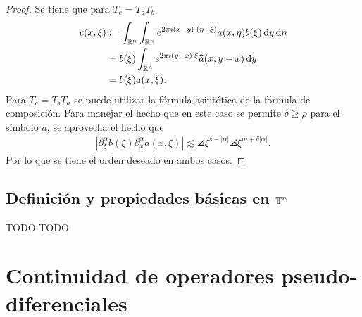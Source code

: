 \begin{proof}
	Se tiene que para $T_c = T_aT_b$
	\begin{align*}
		c(x, \xi) & :=  \int_{\mathbb{R}^n}\int_{\mathbb{R}^n} 
		e^{2\pi i(x-y)\cdot(\eta-\xi)} a(x, \eta)b(\xi)\mathop{}\!\mathrm{d} y \mathop{}\!\mathrm{d} \eta \\ 
		& =  b(\xi)\int_{\mathbb{R}^n}e^{2\pi i(y-x)\cdot\xi} \widehat{a}(x, y-x)\mathop{}\!\mathrm{d} y \\
		& = b(\xi)a(x, \xi).
	\end{align*}
	Para $T_c = T_bT_a$ se puede utilizar la fórmula asintótica de la fórmula de composición. Para manejar el hecho que en este caso se permite $\delta\geq\rho$ para el símbolo $a$, se aprovecha el hecho que 
	\begin{align*}
		|\partial^\alpha_\xi b(\xi) \partial^\alpha_x a(x, \xi)| \lesssim \angles{\xi}^{s-|\alpha|} \angles{\xi}^{m+\delta |\alpha|}.
	\end{align*}
	Por lo que se tiene el orden deseado en ambos casos.
\end{proof}
\section{Definición y propiedades básicas en $\mathbb{T}^n$}
TODO TODO

\chapter{Continuidad de operadores pseudo-diferenciales}

